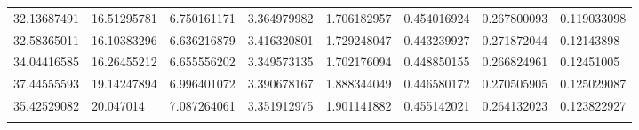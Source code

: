 \begin{landscape}
\begin{longtable}{llllllll}
    32.13687491 & 16.51295781 & 6.750161171 & 3.364979982 & 1.706182957 & 0.454016924 & 0.267800093 & 0.119033098 \\
    32.58365011 & 16.10383296 & 6.636216879 & 3.416320801 & 1.729248047 & 0.443239927 & 0.271872044 & 0.12143898  \\
    34.04416585 & 16.26455212 & 6.655556202 & 3.349573135 & 1.702176094 & 0.448850155 & 0.266824961 & 0.12451005  \\
    37.44555593 & 19.14247894 & 6.996401072 & 3.390678167 & 1.888344049 & 0.446580172 & 0.270505905 & 0.125029087 \\
    35.42529082 & 20.047014   & 7.087264061 & 3.351912975 & 1.901141882 & 0.455142021 & 0.264132023 & 0.123822927 \\
    \label{table:instrumented_amount_benchmark}
  \end{longtable}
\end{landscape}
